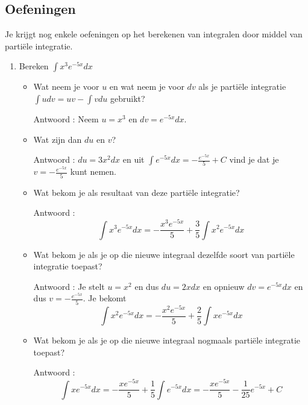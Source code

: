 \subsection{Oefeningen}

Je krijgt nog enkele oefeningen op het berekenen van integralen door middel van parti\"ele integratie.

\begin{enumerate}
	
	\item Bereken $\int x^3e^{-5x}dx$
	
	\begin{itemize}
		\item Wat neem je voor $u$ en wat neem je voor $dv$ als je parti\"ele integratie $\int udv = uv -\int vdu$ gebruikt?
		
		Antwoord : Neem $u=x^3$ en $dv=e^{-5x}dx$.
		
		\item Wat zijn dan $du$ en $v$?
		
		Antwoord : $du=3x^2dx$ en uit $\int e^{-5x}dx=-\frac {e^{-5x}}{5} +C$ vind je dat je $v=-\frac {e^{-5x}}{5}$ kunt nemen.
		
		\item Wat bekom je als resultaat van deze partiële integratie?
		
		Antwoord : \begin{equation*}
		\int x^3e^{-5x}dx = - \frac {x^3e^{-5x}}{5}+\frac {3}{5} \int x^2e^{-5x}dx
		\end{equation*}
		
		\item Wat bekom je als je op die nieuwe integraal dezelfde soort van parti\"ele integratie toepast?
		
		Antwoord : Je stelt $u=x^2$ en dus $du=2xdx$ en opnieuw $dv=e^{-5x}dx$ en dus $v=-\frac {e^{-5x}}{5}$.
		Je bekomt \begin{equation*}
		\int x^2e^{-5x}dx =  - \frac {x^2e^{-5x}}{5}+\frac {2}{5} \int xe^{-5x}dx
		\end{equation*}
		
		\item Wat bekom je als je op die nieuwe integraal nogmaals parti\"ele integratie toepast?
		
		Antwoord : \begin{equation*}
		\int xe^{-5x}dx = - \frac {xe^{-5x}}{5}+\frac {1}{5} \int e^{-5x}dx= - \frac {xe^{-5x}}{5}-\frac{1}{25}e^{-5x}+C
		\end{equation*}
		

\end{itemize}
\end{enumerate}
